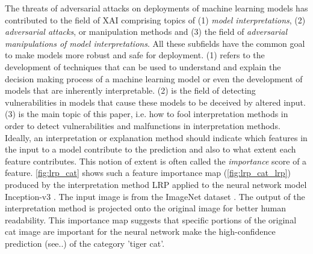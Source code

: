 The threats of adversarial attacks on deployments of machine learning models has contributed to the field of XAI comprising topics of (1) \textit{model interpretations}, (2) \textit{adversarial attacks}, or manipulation methods and (3) the field of \textit{adversarial manipulations of model interpretations}. All these subfields have the common goal to make models more robust and safe for deployment. 
(1) refers to the development of techniques that can be used to understand and explain the decision making process of a machine learning model or even the development of models that are inherently interpretable. (2) is the field of detecting vulnerabilities in models that cause these models to be deceived by altered input. 
(3) is the main topic of this paper, i.e. how to fool interpretation methods in order to detect vulnerabilities and malfunctions in interpretation methods. 
Ideally, an interpretation or explanation method should indicate which features in the input to a model contribute to the prediction and also to what extent each feature contributes. This notion of extent is often called the \textit{importance} score of a feature. \autoref{fig:lrp_cat} shows such a feature importance map (\autoref{fig:lrp_cat_lrp}) produced by the interpretation method LRP \cite{bach2015pixel} applied to the neural network model Inception-v3 \cite{szegedy2016rethinking}. The input image is from the ImageNet dataset \cite{ILSVRC15}. The output of the interpretation method is projected onto the original image for better human readability. This importance map suggests that specific portions of the original cat image are important for the neural network make the high-confidence prediction (see..) of the category 'tiger cat'. 

